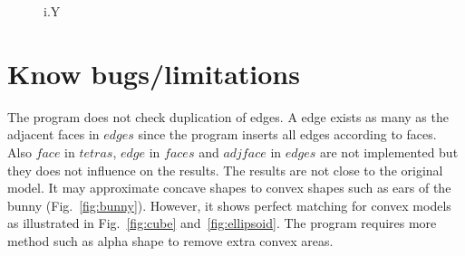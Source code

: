 \documentclass[11pt]{article}
\begin{document}
\begin{figure}[!htb]
\centering
{}
\caption{i.Y}
\label{fig:Y}
\end{figure}

\section{Know bugs/limitations}

The program does not check duplication of edges. A edge exists as many as the adjacent faces in $edges$ since the program inserts all edges according to faces. Also $face$ in $tetras$, $edge$ in $faces$ and $adjface$ in $edges$ are not implemented but they does not influence on the results. The results are not close to the original model. It may approximate concave shapes to convex shapes such as ears of the bunny (Fig.~\ref{fig:bunny}). However, it shows perfect matching for convex models as illustrated in Fig.~\ref{fig:cube} and~\ref{fig:ellipsoid}. The program requires more method such as alpha shape to remove extra convex areas.

%
%
\end{document}
